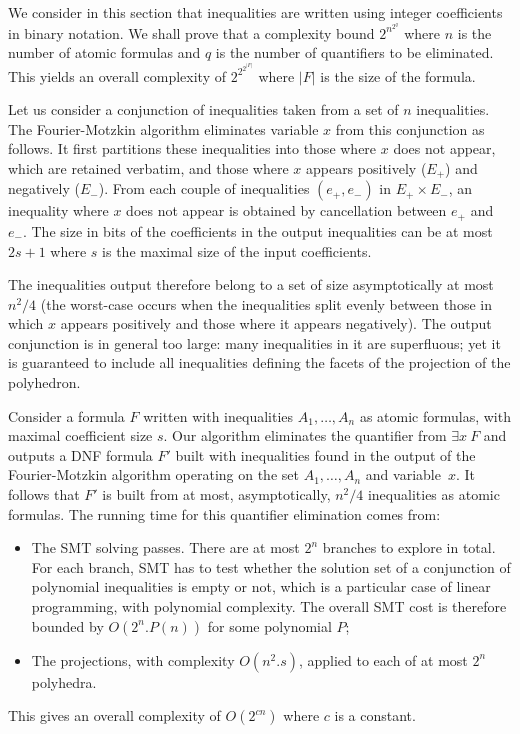 We consider in this section that inequalities are written using integer coefficients in binary notation. We shall prove that a complexity bound $2^{n^{2^q}}$ where $n$ is the number of atomic formulas and $q$ is the number of quantifiers to be eliminated. This yields an overall complexity of $2^{2^{2^{|F|}}}$ where $|F|$ is the size of the formula.

Let us consider a conjunction of inequalities taken from a set of $n$ inequalities. The Fourier-Motzkin algorithm \cite{BradleyManna07,imbert93fouriers} eliminates variable $x$ from this conjunction as follows. It first partitions these inequalities into those where $x$ does not appear, which are retained verbatim, and those where $x$ appears positively ($E_+$) and negatively ($E_-$). From each couple of inequalities $(e_+, e_-)$ in $E_+ \times E_-$, an inequality where $x$ does not appear is obtained by cancellation between $e_+$ and $e_-$. The size in bits of the coefficients in the output inequalities can be at most $2s+1$ where $s$ is the maximal size of the input coefficients.

The inequalities output therefore belong to a set of size asymptotically at most $n^2/4$ (the worst-case occurs when the inequalities split evenly between those in which $x$ appears positively and those where it appears negatively). The output conjunction is in general too large: many inequalities in it are superfluous; yet it is guaranteed to include all inequalities defining the facets of the projection of the polyhedron.

Consider a formula $F$ written with inequalities $A_1,\dots,A_n$ as atomic formulas, with maximal coefficient size $s$. Our algorithm eliminates the quantifier from $\exists x~F$ and outputs a DNF formula $F'$ built with inequalities found in the output of the Fourier-Motzkin algorithm operating on the set $A_1,\dots,A_n$ and variable~$x$. It follows that $F'$ is built from at most, asymptotically, $n^2/4$ inequalities as atomic formulas. The running time for this quantifier elimination comes from:
\begin{itemize}
\item The SMT solving passes. There are at most $2^n$ branches to explore in total. For each branch, SMT has to test whether the solution set of a conjunction of polynomial inequalities is empty or not, which is a particular case of linear programming, with polynomial complexity. The overall SMT cost is therefore bounded by $O(2^n.P(n))$ for some polynomial $P$;
\item The projections, with complexity $O(n^2.s)$, applied to each of at most $2^n$ polyhedra.
\end{itemize}
This gives an overall complexity of $O(2^{cn})$ where $c$ is a constant.

